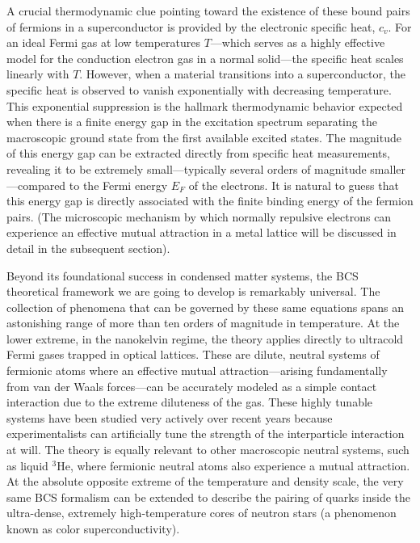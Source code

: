 A crucial thermodynamic clue pointing toward the existence of these bound pairs of fermions in a superconductor is provided by the electronic specific heat, \( c_v \). For an ideal Fermi gas at low temperatures \( T \)—which serves as a highly effective model for the conduction electron gas in a normal solid—the specific heat scales linearly with \( T \). However, when a material transitions into a superconductor, the specific heat is observed to vanish exponentially with decreasing temperature. This exponential suppression is the hallmark thermodynamic behavior expected when there is a finite energy gap in the excitation spectrum separating the macroscopic ground state from the first available excited states. The magnitude of this energy gap can be extracted directly from specific heat measurements, revealing it to be extremely small—typically several orders of magnitude smaller—compared to the Fermi energy \( E_F \) of the electrons. It is natural to guess that this energy gap is directly associated with the finite binding energy of the fermion pairs. (The microscopic mechanism by which normally repulsive electrons can experience an effective mutual attraction in a metal lattice will be discussed in detail in the subsequent section).

Beyond its foundational success in condensed matter systems, the BCS theoretical framework we are going to develop is remarkably universal. The collection of phenomena that can be governed by these same equations spans an astonishing range of more than ten orders of magnitude in temperature. At the lower extreme, in the nanokelvin regime, the theory applies directly to ultracold Fermi gases trapped in optical lattices. These are dilute, neutral systems of fermionic atoms where an effective mutual attraction—arising fundamentally from van der Waals forces—can be accurately modeled as a simple contact interaction due to the extreme diluteness of the gas. These highly tunable systems have been studied very actively over recent years because experimentalists can artificially tune the strength of the interparticle interaction at will. The theory is equally relevant to other macroscopic neutral systems, such as liquid \( ^3\text{He} \), where fermionic neutral atoms also experience a mutual attraction. At the absolute opposite extreme of the temperature and density scale, the very same BCS formalism can be extended to describe the pairing of quarks inside the ultra-dense, extremely high-temperature cores of neutron stars (a phenomenon known as color superconductivity).

